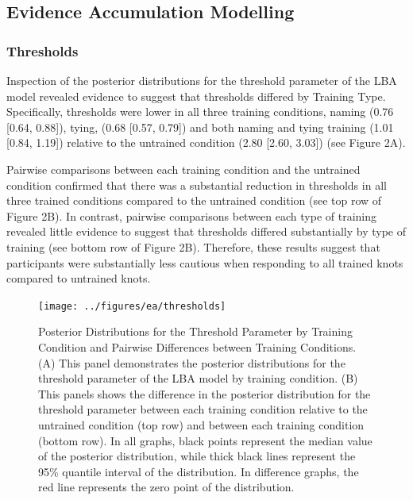 \documentclass[
  man, donotrepeattitle,floatsintext]{apa6}
\begin{document}
\subsection{Evidence Accumulation Modelling}\label{evidence-accumulation-modelling}

\subsubsection{Thresholds}\label{thresholds}

Inspection of the posterior distributions for the threshold parameter of the LBA model revealed evidence to suggest that thresholds differed by Training Type. Specifically, thresholds were lower in all three training conditions, naming (0.76 {[}0.64, 0.88{]}), tying, (0.68 {[}0.57, 0.79{]}) and both naming and tying training (1.01 {[}0.84, 1.19{]}) relative to the untrained condition (2.80 {[}2.60, 3.03{]}) (see Figure 2A).

Pairwise comparisons between each training condition and the untrained condition confirmed that there was a substantial reduction in thresholds in all three trained conditions compared to the untrained condition (see top row of Figure 2B). In contrast, pairwise comparisons between each type of training revealed little evidence to suggest that thresholds differed substantially by type of training (see bottom row of Figure 2B). Therefore, these results suggest that participants were substantially less cautious when responding to all trained knots compared to untrained knots.



\begin{figure}[H]

{\centering \texttt{[image: ../figures/ea/thresholds]} 

}

\caption{Posterior Distributions for the Threshold Parameter by Training Condition and Pairwise Differences between Training Conditions. (A) This panel demonstrates the posterior distributions for the threshold parameter of the LBA model by training condition. (B) This panels shows the difference in the posterior distribution for the threshold parameter between each training condition relative to the untrained condition (top row) and between each training condition (bottom row). In all graphs, black points represent the median value of the posterior distribution, while thick black lines represent the 95\% quantile interval of the distribution. In difference graphs, the red line represents the zero point of the distribution.}\label{fig:threshold-plot}
\end{figure}
\end{document}
